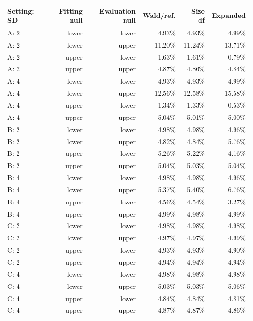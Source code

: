 \begin{tabular}{@{}lrrrrr@{}}
\toprule
Setting: SD & Fitting null & Evaluation null & Wald/ref. & Size df & Expanded\\
\midrule
A: 2 & lower & lower & 4.93\% & 4.93\% & 4.99\%\\
A: 2 & lower & upper & 11.20\% & 11.24\% & 13.71\%\\
A: 2 & upper & lower & 1.63\% & 1.61\% & 0.79\%\\
A: 2 & upper & upper & 4.87\% & 4.86\% & 4.84\%\\
A: 4 & lower & lower & 4.93\% & 4.93\% & 4.99\%\\
A: 4 & lower & upper & 12.56\% & 12.58\% & 15.58\%\\
A: 4 & upper & lower & 1.34\% & 1.33\% & 0.53\%\\
A: 4 & upper & upper & 5.04\% & 5.01\% & 5.00\%\\
B: 2 & lower & lower & 4.98\% & 4.98\% & 4.96\%\\
B: 2 & lower & upper & 4.82\% & 4.84\% & 5.76\%\\
B: 2 & upper & lower & 5.26\% & 5.22\% & 4.16\%\\
B: 2 & upper & upper & 5.04\% & 5.03\% & 5.04\%\\
B: 4 & lower & lower & 4.98\% & 4.98\% & 4.96\%\\
B: 4 & lower & upper & 5.37\% & 5.40\% & 6.76\%\\
B: 4 & upper & lower & 4.56\% & 4.54\% & 3.27\%\\
B: 4 & upper & upper & 4.99\% & 4.98\% & 4.99\%\\
C: 2 & lower & lower & 4.98\% & 4.98\% & 4.98\%\\
C: 2 & lower & upper & 4.97\% & 4.97\% & 4.99\%\\
C: 2 & upper & lower & 4.93\% & 4.93\% & 4.90\%\\
C: 2 & upper & upper & 4.94\% & 4.94\% & 4.94\%\\
C: 4 & lower & lower & 4.98\% & 4.98\% & 4.98\%\\
C: 4 & lower & upper & 5.03\% & 5.03\% & 5.06\%\\
C: 4 & upper & lower & 4.84\% & 4.84\% & 4.81\%\\
C: 4 & upper & upper & 4.87\% & 4.87\% & 4.86\%\\
\bottomrule
\end{tabular}

